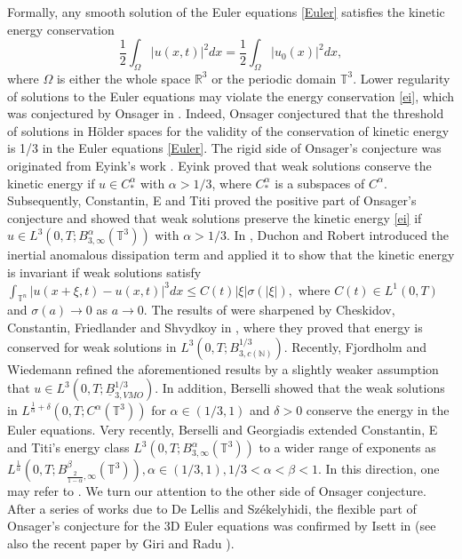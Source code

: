 \documentclass[11pt]{article}
\theoremstyle{plain}\newtheorem{definition}{Definition}[section]
\theoremstyle{definition}\newtheorem{theorem}{Theorem}[section]
\theoremstyle{plain}\newtheorem{lemma}[theorem]{Lemma}
\theoremstyle{plain}\newtheorem{coro}[theorem]{Corollary}
\theoremstyle{plain}\newtheorem{prop}[theorem]{Proposition}
\theoremstyle{remark}\newtheorem{remark}{Remark}[section]
\newcommand{\f}{\frac}
\numberwithin{equation}{section}
\begin{document}
Formally, any smooth solution  of the Euler equations \eqref{Euler} satisfies the kinetic energy conservation
\begin{equation}\label{ei}
\f12\int_{\Omega}|u(x,t)|^{2}dx=\f12\int_{\Omega}|u_{0}(x)|^{2}dx,
\end{equation}
where $\Omega$ is either the whole space $\mathbb{R}^{3}$ or the periodic domain $\mathbb{T}^{3}$.
Lower regularity of solutions to the Euler equations may violate the energy conservation
\eqref{ei}, which was conjectured by Onsager in \cite{[Onsager]}. Indeed, Onsager
conjectured that  the   threshold of solutions in H\"older spaces for the validity of the conservation of kinetic energy is 1/3 in the Euler equations \eqref{Euler}. The rigid side  of Onsager's conjecture  was
originated from Eyink's work \cite{[Eyink]}. Eyink proved that weak solutions conserve the   kinetic energy if $u\in C_{\ast}^{\alpha}$ with $ \alpha>1/3$, where $C_{\ast}^{\alpha}$ is a subspaces of $C^{\alpha}$.
  Subsequently, Constantin, E and Titi \cite{[CET]} proved the   positive  part  of Onsager's conjecture and showed that weak solutions preserve the kinetic  energy \eqref{ei} if $u\in L^{3}(0,T; B^{\alpha}_{3,\infty}(\mathbb{T}^{3}))$ with $\alpha>1/3$. In  \cite{[DR]}, Duchon and Robert introduced the   inertial anomalous dissipation term and applied it to show that the  kinetic  energy is invariant if weak solutions satisfy
  $\int_{\mathbb{T}^{n}}| u(x+\xi,t)-u(x,t) |^3dx \leq C(t)|\xi|\sigma(|\xi|),$ where $C(t)\in L^1(0,T)$ and $\sigma(a)\rightarrow 0$ as $a\rightarrow 0$.
  The results of \cite{[CET],[DR],[Eyink]} were
sharpened  by Cheskidov, Constantin, Friedlander and Shvydkoy  in \cite{[CCFS]}, where they proved that energy is conserved
for weak solutions  in $L^{3} (0,T; B^{1/3}_{3,c(\mathbb{N})}).$
Recently, Fjordholm and Wiedemann refined the aforementioned  results
by a slightly weaker assumption that $u\in L^{3} (0,T;\underline{B}^{1/3 }_{3,VMO})$.
In addition, Berselli \cite{[B]} showed that  the weak solutions in $ L^{\f1\alpha+\delta}(0,T;C^{\alpha}(\mathbb{T}^{3}))$ for $\alpha\in(1/3,1)$ and $\delta>0$   conserve  the energy in the Euler equations.
Very recently, Berselli and Georgiadis \cite{[BG]} extended Constantin, E and Titi's  energy class $L^{3}(0,T; B^{\alpha}_{3,\infty}(\mathbb{T}^{3}))$ to a wider range of exponents as $L^{\f1\alpha}(0,T; B^{\beta}_{\f{2}{1-\alpha},\infty}(\mathbb{T}^{3})), \alpha\in(1/3,1),1/3<\alpha<\beta<1.$  In this direction, one may refer to \cite{[BTW],[BCS],[BG],[BKR],[WWWY],[Chae],[FGSW],[CY]}.
We turn our attention to the other side of Onsager conjecture.
After a series of works \cite{[DS0],[DS1],[DS2]} due to De Lellis and Sz\'ekelyhidi, the flexible part  of Onsager's conjecture for the 3D Euler equations was  confirmed  by Isett in \cite{[Isett]} (see also the recent paper by Giri and   Radu \cite{[GR]}).
\end{document}
